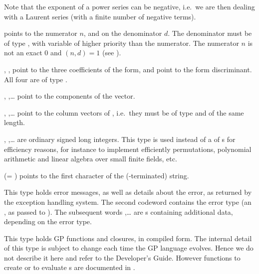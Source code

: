 Note that the exponent of a power series can be negative, i.e.~we are
then dealing with a Laurent series (with a finite number of negative
terms).

%
  points to the
numerator $n$, and  on the denominator $d$. The denominator must be
of type , with variable of higher priority than the numerator. The
numerator $n$ is not an exact $0$ and $(n,d) = 1$ (see ).

%
 , ,
 point to the three coefficients of the form, and  point to
the form discriminant. All four are of type .

%
, ,\dots {} point to the components of the
vector.

 ,
,\dots {} point to the column vectors of ,
i.e.~they must be of type  and of the same length.

, ,\dots {} are ordinary signed long
integers. This type is used instead of a  of s for
efficiency reasons, for instance to implement efficiently permutations,
polynomial arithmetic and linear algebra over small finite fields, etc.

%

 (= ) points to the first character of the
(-terminated) string.

This type holds error messages, as well as details about the error, as
returned by the exception handling system. The second codeword 
contains the error type (an , as passed to ). The
subsequent words ,\dots {} are s containing
additional data, depending on the error type.

This type holds GP functions and closures, in compiled form. The internal detail
of this type is subject to change each time the GP language evolves. Hence we
do not describe it here and refer to the Developer's Guide.  However
functions to create or to evaluate s are documented in
.

